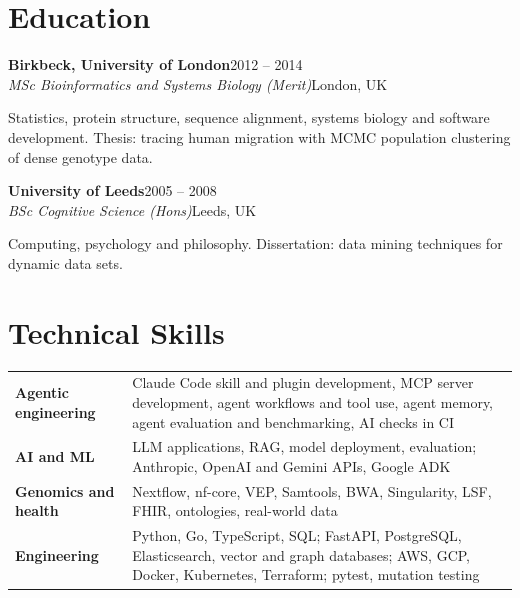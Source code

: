 \documentclass[a4paper,10pt]{article}
\newcommand{\role}[4]{%
  {\bfseries #1}\hfill{\color{muted}#4}\\
  {\itshape #3}\hfill{\color{muted}\small #2}\par}
\newcommand{\gap}{\vspace{8pt}}
\begin{document}
\section{Education}

\role{Birkbeck, University of London}{London, UK}{MSc Bioinformatics and Systems Biology (Merit)}{2012 -- 2014}
{\small Statistics, protein structure, sequence alignment, systems biology and software development. Thesis: tracing human migration with MCMC population clustering of dense genotype data.}
\gap

\role{University of Leeds}{Leeds, UK}{BSc Cognitive Science (Hons)}{2005 -- 2008}
{\small Computing, psychology and philosophy. Dissertation: data mining techniques for dynamic data sets.}

\section{Technical Skills}
{\small
\begin{tabularx}{\linewidth}{@{}>{\bfseries}p{3.1cm}X@{}}
Agentic engineering & Claude Code skill and plugin development, MCP server development, agent workflows and tool use, agent memory, agent evaluation and benchmarking, AI checks in CI \\
AI and ML & LLM applications, RAG, model deployment, evaluation; Anthropic, OpenAI and Gemini APIs, Google ADK \\
Genomics and health & Nextflow, nf-core, VEP, Samtools, BWA, Singularity, LSF, FHIR, ontologies, real-world data \\
Engineering & Python, Go, TypeScript, SQL; FastAPI, PostgreSQL, Elasticsearch, vector and graph databases; AWS, GCP, Docker, Kubernetes, Terraform; pytest, mutation testing \\
\end{tabularx}}
\end{document}
